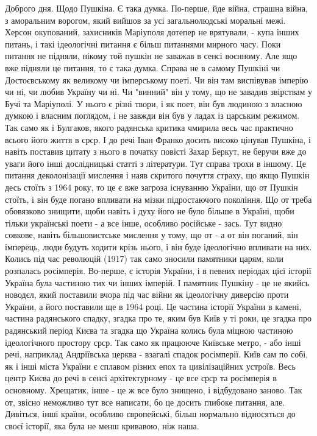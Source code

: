 Доброго дня. Щодо Пушкіна. Є така думка. По-перше, йде війна, страшна війна, з
аморальним ворогом, який вийшов за усі загальнолюдські моральні межі. Херсон
окупований, захисників Маріуполя дотепер не врятували, - купа інших питань, і
такі ідеологічні питання є більш питаннями мирного часу. Поки питання не
підняли, нікому той пушкін не заважав в сенсі воєнному. Але ящо вже підняли це
питання, то є така думка. Справа не в самому Пушкіні чи Достоєвському як
великому чи імперському поеті. Чи він там виспівував імперію чи ні, чи любив
Україну чи ні. Чи "винний" він у тому, що не завадив звірствам у Бучі та
Маріуполі. У нього є різні твори, і як поет, він був людиною з власною думкою і
власним поглядом, і не завжди він був у ладах із царським режимом. Так само як
і Булгаков, якого радянська критика чмирила весь час практично всього його
життя в срср. І до речі Іван Франко досить високо цінував Пушкіна, і навіть
поставив цитату з нього в початку повісті Захар Беркут, не беручи вже до уваги
його інші дослідницькі статті з літератури. Тут справа трохи в іншому. Це
питання деколонізації мислення і наяв скритого почуття страху, що якщо Пушкін
десь стоїть з 1964 року, то це є вже загроза існуванню України, що от Пушкін
стоїть, і він буде погано впливати на мізки підростаючого покоління. Що от
треба обовязково знищити, щоби навіть і духу його не було більше в Україні,
щоби тільки українські поети - а все інше, особливо російське - зась. Тут видно
совкове, навіть більшовистське мислення у тому, що от - а от він поганий, він
імперець, люди будуть ходити крізь нього, і він буде ідеологічно впливати на
них. Колись під час революцій (1917) так само зносили памятники царям, коли
розпалась росімперія. Во-перше, є історія України, і в певних періодах цієї
історії Україна була частиною тих чи інших імперій. І памятник Пушкіну - це не
якийсь новодєл, який поставили вчора під час війни як ідеологічну диверсію
проти України, а його поставили ще в 1964 році. Це частина історії України в
камені, частина радянського спадку, згадка про те, яким був Київ у ті роки, це
згадка про радянський період Києва та згадка що Україна колись була міцною
частиною ідеологічного простору срср. Так само як працююче Київське метро, -
або інші речі, наприклад Андріївська церква - взагалі спадок росімперії. Київ
сам по собі, як і інші міста України є сплавом різних епох та цивілізаційних
устроїв. Весь центр Києва до речі в сенсі архітектурному - це все срср та
росімперія в основному. Хрещатик, інше - це ж все було знищено, і відбудовано
заново. Так от, звісно неможливо тут все написати, бо це досить глибоке
питання, але. Дивіться, інші країни, особливо європейські, більш нормально
відносяться до своєї історії, яка була не менш кривавою, ніж наша.

